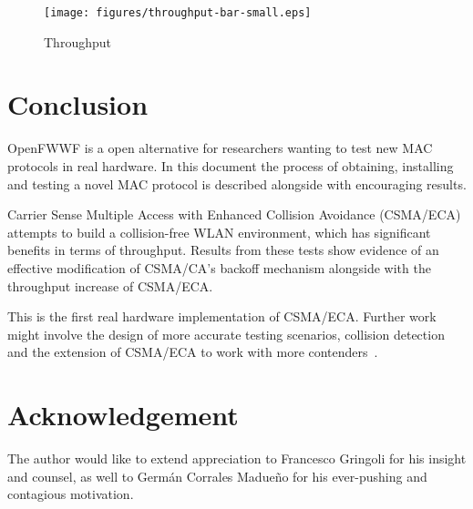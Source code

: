 \documentclass[conference]{IEEEtran}
\begin{document}
\begin{figure}[htbp]
\centering
  \texttt{[image: figures/throughput-bar-small.eps]}
  \caption{Throughput}
  \label{throughput}
\end{figure}

\section{Conclusion}
OpenFWWF is a open alternative for researchers wanting to test new MAC protocols in real hardware. In this document the process of obtaining, installing and testing a novel MAC protocol is described alongside with encouraging results.

Carrier Sense Multiple Access with Enhanced Collision Avoidance (CSMA/ECA) attempts to build a collision-free WLAN environment, which has significant benefits in terms of throughput. Results from these tests show evidence of an effective modification of CSMA/CA's backoff mechanism alongside with the throughput increase of CSMA/ECA.

This is the first real hardware implementation of CSMA/ECA. Further work might involve the design of more accurate testing scenarios, collision detection and the extension of CSMA/ECA to work with more contenders~\cite{research2standards}.

\section{Acknowledgement}
The author would like to extend appreciation to Francesco Gringoli for his insight and counsel, as well to Germán Corrales Madueño for his ever-pushing and contagious motivation.



\end{document}
